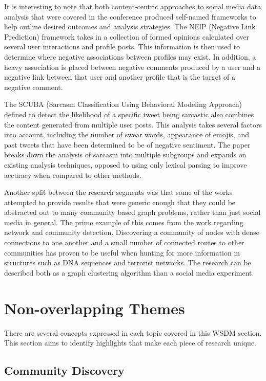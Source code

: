 \documentclass{sig-alternate}
\begin{document}
It is interesting to note that both content-centric approaches to social media data analysis that
were covered in the conference produced self-named frameworks to help outline desired outcomes
and analysis strategies. The NElP (Negative Link Prediction) framework takes in a collection
of formed opinions calculated over several user interactions and profile posts. This information is
then used to determine where negative associations between profiles may exist. In addition, a heavy 
association is placed between negative comments produced by a user and a negative link between that 
user and another profile that is the target of a negative comment. 

The SCUBA (Sarcasm Classification Using Behavioral Modeling Approach) defined to detect
the likelihood of a specific tweet being sarcastic also combines the content generated
from multiple user posts. This analysis takes several factors into account, 
including the number of swear words, appearance of emojis, and past tweets that have been
determined to be of negative sentiment. The paper breaks down the analysis
of sarcasm into multiple subgroups and expands on existing analysis techniques, opposed to using only lexical parsing to 
improve accuracy when compared to other methods.

Another split between the research segments was that some of the works attempted to provide
results that were generic enough that they could be abstracted out to many community based graph
problems, rather than just social media in general. The prime example of this comes from the work regarding
network and community detection. Discovering a community of nodes with dense connections to one another and
a small number of connected routes to other communities has proven to be useful when hunting for more information in
structures such as DNA sequences and terrorist networks. The research can be described both as a graph clustering
algorithm than a social media experiment. \cite{GraphClustering} 

\section{Non-overlapping Themes}
\label{non-overlapping themes}
There are several concepts expressed in each topic covered in this WSDM section. This section aims
to identify highlights that make each piece of research unique.

\subsection{Community Discovery}
\label{community discovery}
\end{document}

